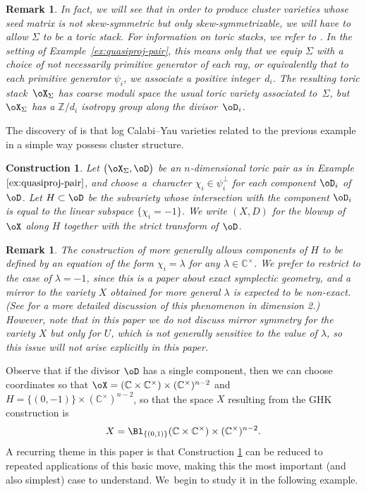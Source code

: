 \documentclass[10pt,a4paper]{amsart}
\numberwithin{equation}{section}
\newtheorem{Construction}[Theorem]{Construction}
\newtheorem{Remark}[Theorem]{Remark} }
\def\CC{\mathbb{C}}
\def\ZZ{\mathbb{Z}}
\begin{document}
\begin{Remark}\label{rem:stackiness}
 In fact, we will see that in order to produce cluster varieties whose seed matrix is not skew-symmetric but only skew-symmetrizable, we will have to allow $\Sigma$ to be a toric stack. For information on toric stacks, we refer to \cite{BCS}. In the setting of Example~\ref{ex:quasiproj-pair}, this means only that we equip $\Sigma$ with a choice of not necessarily primitive generator of each ray, or equivalently that to each primitive generator $\psi_i$, we associate a positive integer~$d_i$. The resulting toric stack~$\oX_\Sigma$ has coarse moduli space the usual toric variety associated to~$\Sigma$, but $\oX_\Sigma$ has a $\ZZ/d_i$ isotropy group along the divisor~$\oD_i$.
\end{Remark}


The discovery of \cite{GHK2,GHK1} is that log Calabi--Yau varieties related to the previous example in a simple way possess cluster structure.
\begin{Construction}\label{constr:ghk-cluster}
 Let $\big(\oX_\Sigma,\oD\big)$ be an $n$-dimensional toric pair as in Example~$\ref{ex:quasiproj-pair}$, and choose a~character $\chi_i\in \psi_i^\perp$ for each component $\oD_i$ of $\oD$.
 Let $H\subset \oD$ be the subvariety whose intersection with the component $\oD_i$ is equal to the linear subspace $\{\chi_i = -1\}$.
 We write $(X,D)$ for the blowup of $\oX$ along $H$ together with the strict transform of $\oD$.
\end{Construction}
\begin{Remark}
 The construction of \cite{GHK2} more generally allows components of $H$ to be defined by an equation of the form $\chi_i = \lambda$ for any $\lambda\in \CC^\times$. We prefer to restrict to the case of $\lambda = -1$, since this is a paper about exact symplectic geometry, and a mirror to the variety $X$ obtained for more general $\lambda$ is expected to be non-exact. (See \cite[Section~2.2]{HK20} for a more detailed discussion of this phenomenon in dimension 2.) However, note that in this paper we do not discuss mirror symmetry for the variety $X$ but only for $U$, which is not generally sensitive to the value of $\lambda$, so this issue will not arise explicitly in this paper.
\end{Remark}

Observe that if the divisor $\oD$ has a single component, then we can choose coordinates so that $\oX = (\CC\times \CC^\times)\times(\CC^\times)^{n-2}$ and $H=\{(0,-1)\}\times (\CC^\times)^{n-2}$, so that the space $X$ resulting from the GHK construction is
\[X = \Bl_{\{(0,1)\}}(\CC\times\CC^\times)\times (\CC^\times)^{n-2}.\]
A recurring theme in this paper is that Construction \ref{constr:ghk-cluster} can be reduced to repeated applications of this basic move, making this the most important (and also simplest) case to understand. We~begin to study it in the following example.
\end{document}
